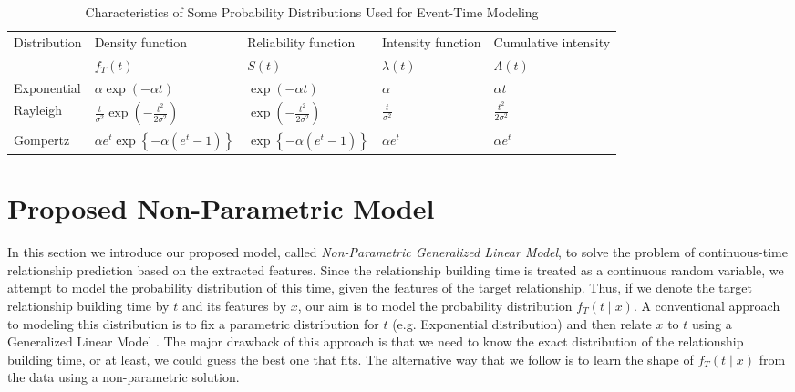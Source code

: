 \begin{table*}
	\centering
	\caption{Characteristics of Some Probability Distributions Used for Event-Time Modeling}
	\label{table:dists}
	\begin{tabu} to \textwidth {X X[c] X[c] X[c] X[c]}
		\toprule
		Distribution & Density function & Reliability function & Intensity function & Cumulative intensity\\
		& $f_T(t)$ & $S(t)$ & $\lambda(t)$ & $\Lambda(t)$\\[1pt]
		\midrule %
		Exponential & $\alpha\exp(-\alpha t)$ & $\exp(-\alpha t)$ & $\alpha$ & $\alpha t$\\[4pt]
		Rayleigh & $\frac{t}{\sigma^2}\exp(-\frac{t^2}{2\sigma^2})$ & $\exp(-\frac{t^2}{2\sigma^2})$ & $\frac{t}{\sigma^2}$ & $\frac{t^2}{2\sigma^2}$\\[4pt]
		Gompertz & $\alpha e^t\exp\left\lbrace -\alpha(e^t-1) \right\rbrace$ & $\exp\left\lbrace -\alpha(e^t-1) \right\rbrace$ & $\alpha e^t$ & $\alpha e^t$\\[2pt]
		\bottomrule %
	\end{tabu}
\end{table*}

\section{Proposed Non-Parametric Model}\label{sec:method}
In this section we introduce our proposed model, called \emph{Non-Parametric Generalized Linear Model}, to solve the problem of continuous-time relationship prediction based on the extracted features. 
Since the relationship building time is treated as a continuous random variable, we attempt to model the probability distribution of this time, given the features of the target relationship. Thus, if we denote the target relationship building time by $t$ and its features by $x$, our aim is to model the probability distribution $f_T(t\mid x)$. A conventional approach to modeling this distribution is to fix a parametric distribution for $t$ (e.g. Exponential distribution) and then relate $x$ to $t$ using a Generalized Linear Model \cite{sun2012will}. The major drawback of this approach is that we need to know the exact distribution of the relationship building time, or at least, we could guess the best one that fits. The alternative way that we follow is to learn the shape of $f_T(t\mid x)$ from the data using a non-parametric solution.

